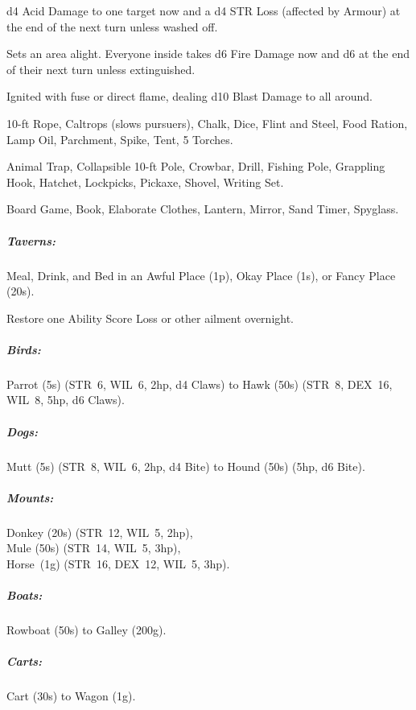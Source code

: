 \documentclass[itdr/core]{subfiles}
\begin{document}

 d4 Acid Damage to one target now and a d4 STR Loss (affected by Armour) at the end of the next turn unless washed off.

 Sets an area alight. Everyone inside takes d6 Fire Damage now and d6 at the end of their next turn unless extinguished.

 Ignited with fuse or direct flame, dealing d10 Blast Damage to all around.

 10-ft Rope, Caltrops (slows pursuers), Chalk, Dice, Flint and Steel, Food Ration, Lamp Oil, Parchment, Spike, Tent, 5 Torches.

 Animal Trap, Collapsible 10-ft Pole, Crowbar, Drill, Fishing Pole, Grappling Hook, Hatchet, Lockpicks, Pickaxe, Shovel, Writing Set.

 Board Game, Book, Elaborate Clothes, Lantern, Mirror, Sand Timer, Spyglass.



\subparagraph{Taverns:} Meal, Drink, and Bed in an Awful Place (1p), Okay Place (1s), or Fancy Place (20s).

 Restore one Ability Score Loss or other ailment overnight.

\subparagraph{Birds:} Parrot (5s) (STR~6, WIL~6, 2hp, d4 Claws) to Hawk (50s) (STR~8, DEX~16, WIL~8, 5hp, d6 Claws).

\subparagraph{Dogs:} Mutt (5s) (STR~8, WIL~6, 2hp, d4 Bite) to Hound (50s) (5hp, d6 Bite).

\subparagraph{Mounts:} Donkey (20s) (STR~12, WIL~5, 2hp),\\
Mule (50s) (STR~14, WIL~5, 3hp),\\
Horse~(1g) (STR~16, DEX~12, WIL~5, 3hp).

\subparagraph{Boats:} Rowboat (50s) to Galley (200g).

\subparagraph{Carts:} Cart (30s) to Wagon (1g).
\end{document}
